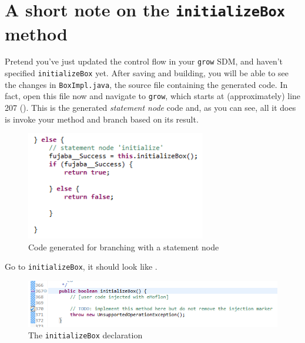 \newpage
\hypertarget{initialize notes}{}
\section{A short note on the \texttt{initializeBox} method}
\genHeader

Pretend you've just updated the control flow in your \texttt{grow} SDM, and haven't specified \texttt{initializeBox} yet. After saving and building, you will be
able to see the changes in \texttt{BoxImpl.java}, the source file containing the generated code. In fact, open this file now and navigate to \texttt{grow},
which starts at (approximately) line 207 (). This is the generated \emph{statement node} code and, as you can see, all it does is
invoke your method and branch based on its result. 

\begin{figure}[htp]
\begin{center}
  \includegraphics[width=0.7\textwidth]{../../org.moflon.doc.handbook.03_storyDiagrams/09_conditionalBranching/visCBImages/eclipse_boxImplStatementNode}
  \caption{Code generated for branching with a statement node}
  \label{eclipse:initBoxImpl}
\end{center}
\end{figure}

Go to \texttt{initializeBox}, it should look like .

\begin{figure}[htp]
\begin{center}
  \includegraphics[width=\textwidth]{../../org.moflon.doc.handbook.03_storyDiagrams/09_conditionalBranching/visCBImages/eclipse_initializeBoxDeclaration}
  \caption{The \texttt{initializeBox} declaration}
  \label{eclipse:initBoxDecl}
\end{center}
\end{figure}

